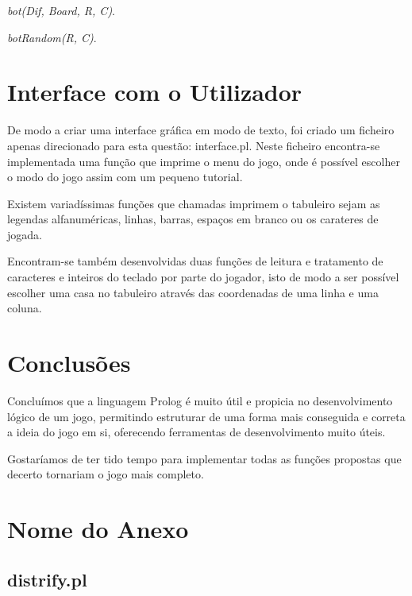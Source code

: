 \documentclass[a4paper]{article}
\begin{document}
\textit{bot(Dif, Board, R, C)}.

\textit{botRandom(R, C)}.


\section{Interface com o Utilizador}

De modo a criar uma interface gráfica em modo de texto, foi criado um ficheiro apenas direcionado para esta questão: interface.pl. Neste ficheiro encontra-se implementada uma função que imprime o menu do jogo, onde é possível escolher o modo do jogo assim com um pequeno tutorial. 

Existem variadíssimas funções que chamadas imprimem o tabuleiro sejam as legendas alfanuméricas, linhas, barras, espaços em branco ou os carateres de jogada. 

Encontram-se também desenvolvidas duas funções de leitura e tratamento de caracteres e inteiros do teclado por parte do jogador, isto de modo a ser possível escolher uma casa no tabuleiro através das coordenadas de uma linha e uma coluna.

\section{Conclusões}

Concluímos que a linguagem Prolog é muito útil e propicia no desenvolvimento lógico de um jogo, permitindo estruturar de uma forma mais conseguida e correta a ideia do jogo em si, oferecendo ferramentas de desenvolvimento muito úteis.

Gostaríamos de ter tido tempo para implementar todas as funções propostas que decerto tornariam o jogo mais completo.

\clearpage
{}
\renewcommand\refname{Bibliografia}



\newpage
\appendix
\section{Nome do Anexo}

\subsection{distrify.pl}


\end{document}
